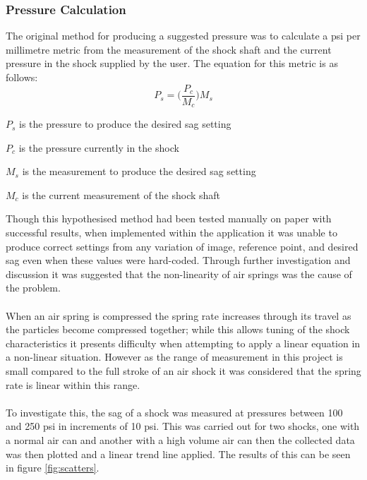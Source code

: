 	\subsubsection{Pressure Calculation}
		The original method for producing a suggested pressure was to calculate a psi per millimetre metric from the measurement of the shock shaft and the current pressure in the shock supplied by the user. The equation for this metric is as follows:
		\begin{equation}
			\label{equ:measureobj}
			P_s = \Bigg(\frac{P_c}{M_c}\Bigg)M_s
		\end{equation}
		\begin{where}
			\item $P_s$ is the pressure to produce the desired sag setting
			\item $P_c$ is the pressure currently in the shock
			\item $M_s$ is the measurement to produce the desired sag setting
			\item $M_c$ is the current measurement of the shock shaft
		\end{where}
		\vspace{5mm}
		Though this hypothesised method had been tested manually on paper with successful results, when implemented within the application it was unable to produce correct settings from any variation of image, reference point, and desired sag even when these values were hard-coded. Through further investigation and discussion it was suggested that the non-linearity of air springs was the cause of the problem.
		\\\\
		When an air spring is compressed the spring rate increases through its travel as the particles become compressed together; while this allows tuning of the shock characteristics it presents difficulty when attempting to apply a linear equation in a non-linear situation. However as the range of measurement in this project is small compared to the full stroke of an air shock it was considered that the spring rate is linear within this range.
		\\\\
		To investigate this, the sag of a shock was measured at pressures between 100 and 250 psi in increments of 10 psi. This was carried out for two shocks, one with a normal air can and another with a high volume air can then the collected data was then plotted and a linear trend line applied. The results of this can be seen in figure \ref{fig:scatters}.
